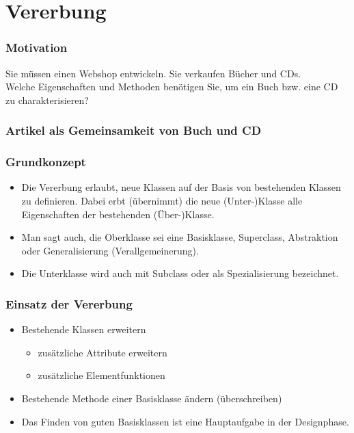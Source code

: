 
\part{Vererbung}
\label{sec:Vererbung}

\section{Motivation}
\label{sec:Motivation}
Sie müssen einen Webshop entwickeln. Sie verkaufen Bücher und CDs.\\
Welche Eigenschaften und Methoden benötigen Sie, um ein Buch bzw. eine CD zu charakterisieren?

\section{Artikel als Gemeinsamkeit von Buch und CD}
\label{sec:Artikel als Gemeinsamkeit von Buch und CD}


\section{Grundkonzept}
\label{sec:Grundkonzept}
\begin{itemize}
	\item Die Vererbung erlaubt, neue Klassen auf der Basis von bestehenden Klassen zu definieren. Dabei erbt (übernimmt) die neue (Unter-)Klasse alle Eigenschaften der bestehenden (Über-)Klasse.
	\item Man sagt auch, die Oberklasse sei eine Basisklasse, Superclass, Abstraktion oder Generalisierung (Verallgemeinerung).
	\item Die Unterklasse wird auch mit Subclass oder als Spezialisierung bezeichnet.
\end{itemize}

\section{Einsatz der Vererbung}
\label{sec:Einsatz der Vererbung}
\begin{itemize}
	\item Bestehende Klassen erweitern
	\begin{itemize}
		\item zusätzliche Attribute erweitern
		\item zusätzliche Elementfunktionen
	\end{itemize}
	\item Bestehende Methode einer Basisklasse ändern (überschreiben)
	\item Das Finden von guten Basisklassen ist eine Hauptaufgabe in der Designphase.
\end{itemize}

